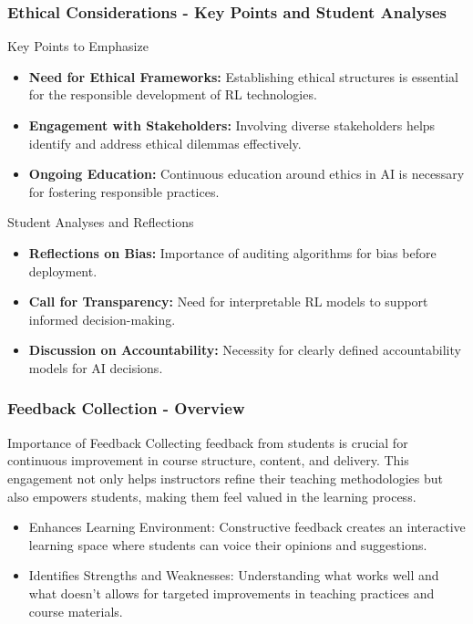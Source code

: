 \documentclass[aspectratio=169]{beamer}
\begin{document}
\begin{frame}[fragile]
    \frametitle{Ethical Considerations - Key Points and Student Analyses}
    \begin{block}{Key Points to Emphasize}
        \begin{itemize}
            \item \textbf{Need for Ethical Frameworks:} Establishing ethical structures is essential for the responsible development of RL technologies.
            \item \textbf{Engagement with Stakeholders:} Involving diverse stakeholders helps identify and address ethical dilemmas effectively.
            \item \textbf{Ongoing Education:} Continuous education around ethics in AI is necessary for fostering responsible practices.
        \end{itemize}
    \end{block}
    
    \begin{block}{Student Analyses and Reflections}
        \begin{itemize}
            \item \textbf{Reflections on Bias:} Importance of auditing algorithms for bias before deployment.
            \item \textbf{Call for Transparency:} Need for interpretable RL models to support informed decision-making.
            \item \textbf{Discussion on Accountability:} Necessity for clearly defined accountability models for AI decisions.
        \end{itemize}
    \end{block}
\end{frame}

\begin{frame}[fragile]
    \frametitle{Feedback Collection - Overview}
    \begin{block}{Importance of Feedback}
        Collecting feedback from students is crucial for continuous improvement in course structure, content, and delivery. This engagement not only helps instructors refine their teaching methodologies but also empowers students, making them feel valued in the learning process.
    \end{block}
    
    \begin{itemize}
        \item Enhances Learning Environment: Constructive feedback creates an interactive learning space where students can voice their opinions and suggestions.
        \item Identifies Strengths and Weaknesses: Understanding what works well and what doesn’t allows for targeted improvements in teaching practices and course materials.
    \end{itemize}
\end{frame}
\end{document}
